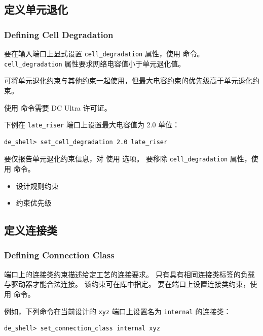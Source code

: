 \subsection{定义单元退化}
\subsubsection*{Defining Cell Degradation}

要在输入端口上显式设置 \texttt{cell\_degradation} 属性，使用  命令。
\texttt{cell\_degradation} 属性要求网络电容值小于单元退化值。

可将单元退化约束与其他约束一起使用，但最大电容约束的优先级高于单元退化约束。

\begin{noteBox}
使用  命令需要 DC Ultra 许可证。
\end{noteBox}

下例在 \texttt{late\_riser} 端口上设置最大电容值为 2.0 单位：
\begin{lstlisting}
de_shell> set_cell_degradation 2.0 late_riser
\end{lstlisting}

要仅报告单元退化约束信息，对  使用  选项。
要移除 \texttt{cell\_degradation} 属性，使用  命令。

\begin{seeAlsoBox}
\begin{itemize}
  \item 设计规则约束
  \item 约束优先级
\end{itemize}
\end{seeAlsoBox}

\subsection{定义连接类}
\subsubsection*{Defining Connection Class}

端口上的连接类约束描述给定工艺的连接要求。
只有具有相同连接类标签的负载与驱动器才能合法连接。
该约束可在库中指定。
要在端口上设置连接类约束，使用  命令。

例如，下列命令在当前设计的 \texttt{xyz} 端口上设置名为 \texttt{internal} 的连接类：
\begin{lstlisting}
de_shell> set_connection_class internal xyz
\end{lstlisting}

